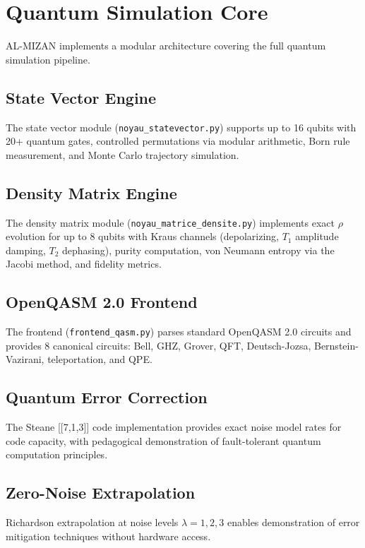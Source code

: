 \documentclass[preprint,12pt]{elsarticle}
\begin{document}
\section{Quantum Simulation Core}

AL-MIZAN implements a modular architecture covering the full quantum simulation pipeline.

\subsection{State Vector Engine}

The state vector module (\texttt{noyau\_statevector.py}) supports up to 16 qubits with 20+ quantum gates, controlled permutations via modular arithmetic, Born rule measurement, and Monte Carlo trajectory simulation.

\subsection{Density Matrix Engine}

The density matrix module (\texttt{noyau\_matrice\_densite.py}) implements exact $\rho$ evolution for up to 8 qubits with Kraus channels (depolarizing, $T_1$ amplitude damping, $T_2$ dephasing), purity computation, von Neumann entropy via the Jacobi method, and fidelity metrics.

\subsection{OpenQASM 2.0 Frontend}

The frontend (\texttt{frontend\_qasm.py}) parses standard OpenQASM 2.0 circuits and provides 8 canonical circuits: Bell, GHZ, Grover, QFT, Deutsch-Jozsa, Bernstein-Vazirani, teleportation, and QPE.

\subsection{Quantum Error Correction}

The Steane [[7,1,3]] code implementation provides exact noise model rates for code capacity, with pedagogical demonstration of fault-tolerant quantum computation principles.

\subsection{Zero-Noise Extrapolation}

Richardson extrapolation at noise levels $\lambda = 1, 2, 3$ enables demonstration of error mitigation techniques without hardware access.
\end{document}
